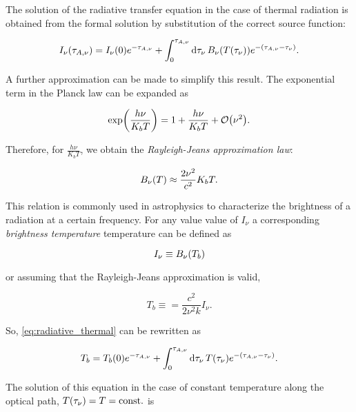 The solution of the radiative transfer equation in the case of thermal
radiation is obtained from the formal solution by substitution of the
correct source function:

\begin{equation}
        I_\nu\qty(\tau_{A,\nu}) = I_\nu\qty(0) e^{-\tau_{A,\nu}} +
        \int^{\tau_{A,\nu}}_0 \dd{\tau_\nu} B_\nu\qty(T\qty(\tau_\nu))
        e^{-\qty(\tau_{A,\nu} - \tau_\nu)}.
        \label{eq:radiative_thermal}
\end{equation}

A further approximation can be made to simplify this result.
The exponential term in the Planck law can be expanded as

\begin{equation}
       \exp(\frac{h\nu}{K_b T}) = 1 + \frac{h\nu}{K_b T} + \order{\nu^2}.
\end{equation}

Therefore, for $\frac{h \nu}{K_b T}$, we obtain the \emph{Rayleigh-Jeans
approximation law}:

\begin{equation}
        B_\nu\qty(T) \approx \frac{2\nu^2}{c^2} K_b T.
\end{equation}

This relation is commonly used in astrophysics to characterize the
brightness of a radiation at a certain frequency. For any value value of
$I_\nu$ a corresponding \emph{brightness temperature} temperature can be
defined as

\begin{equation}
        I_\nu \equiv B_\nu\qty(T_b)
\end{equation}

or assuming that the Rayleigh-Jeans approximation is valid,

\begin{equation}
        T_b \equiv = \frac{c^2}{2\nu^2k} I_\nu.
\end{equation}

So, \autoref{eq:radiative_thermal} can be rewritten as

\begin{equation}
        T_b = T_b\qty(0) e^{-\tau_{A,\nu}} +
        \int^{\tau_{A,\nu}}_0 \dd{\tau_\nu} T\qty(\tau_\nu)
        e^{-\qty(\tau_{A,\nu} - \tau_\nu)}.
\end{equation}

The solution of this equation in the case of constant temperature along the
optical path, $T\qty(\tau_\nu) = T = \text{const.}$ is

